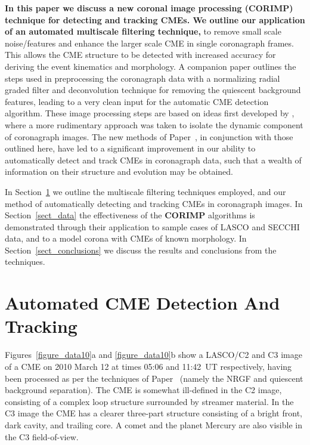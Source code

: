 \documentclass[preprint2]{aastex}
\newcommand{\RNum}[1]{\uppercase\expandafter{\romannumeral #1\relax}}
\begin{document}
{\bf In this paper we discuss a new coronal image processing (CORIMP) technique for detecting and tracking CMEs. We outline our application of an automated multiscale filtering technique,} to remove small scale noise/features and enhance the larger scale CME in single coronagraph frames. This allows the CME structure to be detected with increased accuracy for deriving the event kinematics and morphology. A companion paper \citep[][hereafter referred to as Paper~\RNum{1}]{2012Paper1} outlines the steps used in preprocessing the coronagraph data with a normalizing radial graded filter \citep[NRGF;][]{2006SoPh..236..263M} and deconvolution technique for removing the quiescent background features, leading to a very clean input for the automatic CME detection algorithm. These image processing steps are based on ideas first developed by \citet{2010ApJ...711..631M}, where a more rudimentary approach was taken to isolate the dynamic component of coronagraph images. The new methods of Paper~\RNum{1}, in conjunction with those outlined here, have led to a significant improvement in our ability to automatically detect and track CMEs in coronagraph data, such that a wealth of information on their structure and evolution may be obtained.

In Section~\ref{sect_automation} we outline the multiscale filtering techniques employed, and our method of automatically detecting and tracking CMEs in coronagraph images. In Section~\ref{sect_data} the effectiveness of the {\bf CORIMP} algorithms is demonstrated through their application to sample cases of LASCO and SECCHI data, and to a model corona with CMEs of known morphology. In Section~\ref{sect_conclusions} we discuss the results and conclusions from the techniques.


\section{Automated CME Detection And Tracking}
\label{sect_automation}

Figures~\ref{figure_data10}a and \ref{figure_data10}b show a LASCO/C2 and C3 image of a CME on 2010 March 12 at times 05:06 and 11:42~UT respectively, having been processed as per the techniques of Paper~\RNum{1} (namely the NRGF and quiescent background separation). The CME is somewhat ill-defined in the C2 image, consisting of a complex loop structure surrounded by streamer material. In the C3 image the CME has a clearer three-part structure consisting of a bright front, dark cavity, and trailing core. A comet and the planet Mercury are also visible in the C3 field-of-view.   
\end{document}
